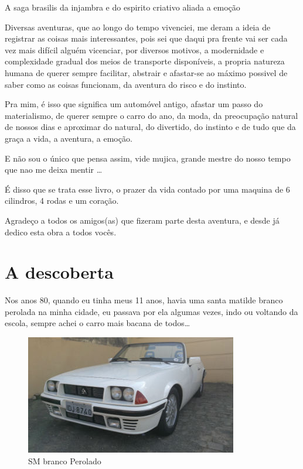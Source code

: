 \documentclass[a4paper]{report}
\begin{document}
A saga brasilis da injambra e do espirito criativo aliada a emo\c{c}\~ao

Diversas aventuras, que ao longo do tempo vivenciei, me deram a ideia de 
registrar as coisas mais interessantes, pois sei que daqui pra frente vai ser cada vez mais dif\'icil algu\'em vicenciar, por diversos motivos, a modernidade e complexidade gradual dos meios de transporte dispon\'iveis, a propria
natureza humana de querer sempre facilitar, abstrair e afastar-se ao m\'aximo possivel de saber como as coisas funcionam, da aventura do risco e do instinto.

Pra mim, \'e isso que significa um autom\'ovel antigo, afastar um passo do materialismo, de querer sempre o carro do ano, da moda, da preocupa\c{c}\~ao natural de nossos dias
e aproximar do natural, do divertido, do instinto e de tudo que da gra\c{c}a a vida, a aventura, a emo\c{c}\~ao.

E n\~ao sou o \'unico que pensa assim, vide mujica, grande mestre do nosso tempo que nao me deixa mentir \dots

\'E disso que se trata esse livro, o prazer da vida contado por uma maquina de 6 cilindros, 4 rodas e um cora\c{c}\~ao.

Agrade\c{c}o a todos os amigos(as) que fizeram parte desta aventura, e desde j\'a dedico esta obra a todos voc\^es.

\clearpage

\section*{A descoberta}
Nos anos 80, quando eu tinha meus 11 anos, havia uma santa matilde branco perolada na minha cidade,
eu passava por ela algumas vezes, indo ou voltando da escola, sempre achei o carro mais bacana de todos\dots

\begin{figure}[!htb]
\centering
\includegraphics{sm_bco_per}
\caption{SM branco Perolado}
\label{sm_bco}
\end{figure}
\end{document}
